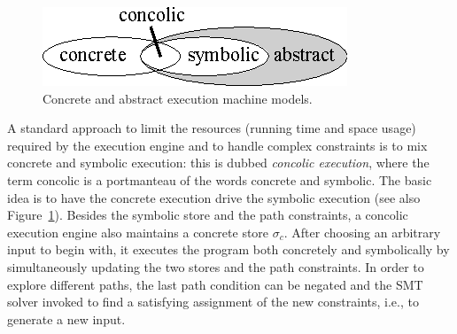 \begin{figure}[t]
\centering
\includegraphics[width=0.35\columnwidth]{images/concrete-abstract.eps} 
\caption{Concrete and abstract execution machine models.}
\label{fig:concrete-symbolic}
\end{figure}

A standard approach to limit the resources (running time and space usage) required by the execution engine and to handle complex constraints is to mix concrete and symbolic execution: this is dubbed {\em concolic execution}, where the term concolic is a portmanteau of the words concrete and symbolic. The basic idea is to have the concrete execution drive the symbolic execution (see also Figure~\ref{fig:concrete-symbolic}). Besides the symbolic store and the path constraints, a concolic execution engine also maintains a concrete store $\sigma_c$. After choosing an arbitrary input to begin with, it executes the program both concretely and symbolically by simultaneously updating the two stores and the path constraints. In order to explore different paths, the last path condition can be negated and the SMT solver invoked to find a satisfying assignment of the new constraints, i.e., to generate a new input.



